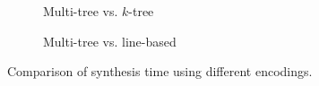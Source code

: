\begin{figure}[t]
    \centering
     \begin{subfigure}[b]{0.47\textwidth}
         \centering
         \caption{Multi-tree vs. \(k\)-tree}
         \label{fig:mt_vs_ktree}
     \end{subfigure}
     \hfill
     \begin{subfigure}[b]{0.47\textwidth}
         \centering
         \caption{Multi-tree vs. line-based}
         \label{fig:mt_vs_lines}
     \end{subfigure}
\caption{Comparison of synthesis time using different encodings.}
\label{fig:time-comparison-encodings}
\end{figure}